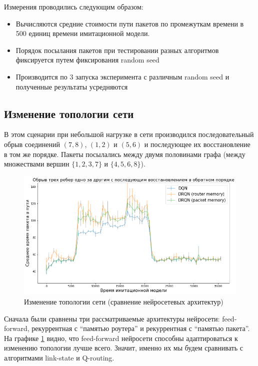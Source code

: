 \documentclass[specification, annotation]{itmo-student-thesis}
\begin{document}
Измерения проводились следующим образом:

\begin{itemize}
  \item Вычисляются средние стоимости пути пакетов по промежуткам времени в 500
    единиц времени имитационной модели.
  \item Порядок посылания пакетов при тестировании разных алгоритмов фиксируется
    путем фиксирования random seed
  \item Производится по 3 запуска эксперимента с различным random seed и
    полученные результаты усредняются
\end{itemize}

\subsection{Изменение топологии сети}\label{experiments:simple/links}

В этом сценарии при небольшой нагрузке в сети производился последовательный
обрыв соединений $(7, 8)$, $(1, 2)$ и $(5, 6)$ и последующее их восстановление в том
же порядке. Пакеты посылались между двумя половинами графа (между множествами
вершин $\{1, 2, 3, 7\}$ и $\{4, 5, 6, 8\}$).

\begin{figure}[!h]
  \caption{Изменение топологии сети (сравнение нейросетевых
    архитектур)}\label{experiment-link-failures-networks}
  \centering
  \includegraphics[scale=0.6]{experiment-link-failures-networks}
\end{figure}

Сначала были сравнены три рассматриваемые архитектуры нейросети: feed-forward,
рекуррентная с \enquote{памятью роутера} и рекуррентная с \enquote{памятью пакета}. На
графике \ref{experiment-link-failures-networks} видно, что feed-forward
нейросети способны адаптироваться к изменению топологии лучше всего. Значит,
именно их мы будем сравнивать с алгоритмами link-state и Q-routing.
\end{document}
